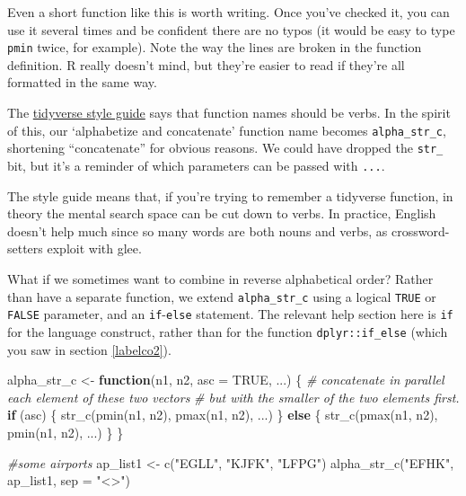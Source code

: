 \documentclass[
]{book}
\newenvironment{Shaded}{\begin{snugshade}}{\end{snugshade}}
\newcommand{\AttributeTok}[1]{\textcolor[rgb]{0.77,0.63,0.00}{#1}}
\newcommand{\CommentTok}[1]{\textcolor[rgb]{0.56,0.35,0.01}{\textit{#1}}}
\newcommand{\ConstantTok}[1]{\textcolor[rgb]{0.00,0.00,0.00}{#1}}
\newcommand{\ControlFlowTok}[1]{\textcolor[rgb]{0.13,0.29,0.53}{\textbf{#1}}}
\newcommand{\FunctionTok}[1]{\textcolor[rgb]{0.00,0.00,0.00}{#1}}
\newcommand{\NormalTok}[1]{#1}
\newcommand{\OtherTok}[1]{\textcolor[rgb]{0.56,0.35,0.01}{#1}}
\newcommand{\StringTok}[1]{\textcolor[rgb]{0.31,0.60,0.02}{#1}}
\begin{document}
Even a short function like this is worth writing. Once you've checked it, you can use it several times and be confident there are no typos (it would be easy to type \texttt{pmin} twice, for example). Note the way the lines are broken in the function definition. R really doesn't mind, but they're easier to read if they're all formatted in the same way.

The \href{https://style.tidyverse.org/functions.html}{tidyverse style guide} says that function names should be verbs. In the spirit of this, our `alphabetize and concatenate' function name becomes \texttt{alpha\_str\_c}, shortening ``concatenate'' for obvious reasons. We could have dropped the \texttt{str\_} bit, but it's a reminder of which parameters can be passed with \texttt{...}.

The style guide means that, if you're trying to remember a tidyverse function, in theory the mental search space can be cut down to verbs. In practice, English doesn't help much since so many words are both nouns and verbs, as crossword-setters exploit with glee.

What if we sometimes want to combine in reverse alphabetical order? Rather than have a separate function, we extend \texttt{alpha\_str\_c} using a logical \texttt{TRUE} or \texttt{FALSE} parameter, and an \texttt{if}-\texttt{else} statement. The relevant help section here is \texttt{if} for the language construct, rather than for the function \texttt{dplyr::if\_else} (which you saw in section \ref{labelco2}).

\begin{Shaded}
\begin{Highlighting}[]
\NormalTok{alpha\_str\_c }\OtherTok{\textless{}{-}} \ControlFlowTok{function}\NormalTok{(n1, n2, }\AttributeTok{asc =} \ConstantTok{TRUE}\NormalTok{, ...) \{}
  \CommentTok{\# concatenate in parallel each element of these two vectors}
  \CommentTok{\# but with the smaller of the two elements first.}
  \ControlFlowTok{if}\NormalTok{ (asc) \{}
    \FunctionTok{str\_c}\NormalTok{(}\FunctionTok{pmin}\NormalTok{(n1, n2), }\FunctionTok{pmax}\NormalTok{(n1, n2), ...)}
\NormalTok{  \} }\ControlFlowTok{else}\NormalTok{ \{}
    \FunctionTok{str\_c}\NormalTok{(}\FunctionTok{pmax}\NormalTok{(n1, n2), }\FunctionTok{pmin}\NormalTok{(n1, n2), ...)}
\NormalTok{  \}}
\NormalTok{\}}

\CommentTok{\#some airports}
\NormalTok{ap\_list1 }\OtherTok{\textless{}{-}} \FunctionTok{c}\NormalTok{(}\StringTok{"EGLL"}\NormalTok{, }\StringTok{"KJFK"}\NormalTok{, }\StringTok{"LFPG"}\NormalTok{)}
\FunctionTok{alpha\_str\_c}\NormalTok{(}\StringTok{"EFHK"}\NormalTok{, ap\_list1, }\AttributeTok{sep =} \StringTok{"\textless{}\textgreater{}"}\NormalTok{)}
\end{Highlighting}
\end{Shaded}
\end{document}
